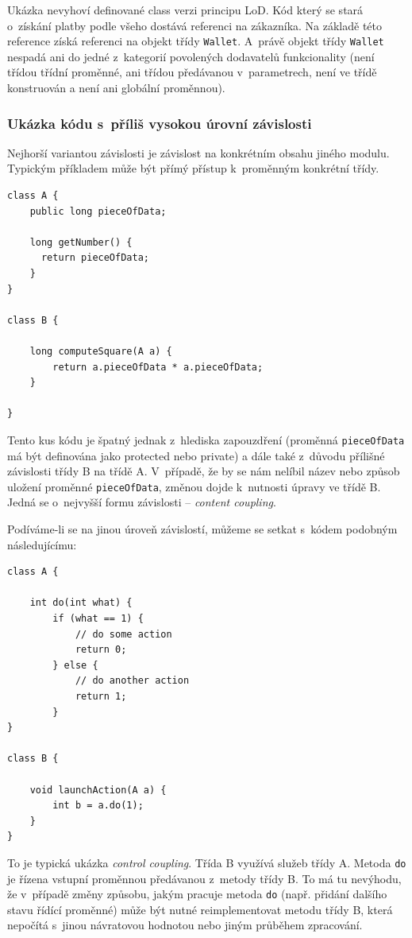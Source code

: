 Ukázka nevyhoví definované class verzi principu LoD. Kód který se stará o~získání platby podle všeho dostává referenci na zákazníka. Na základě této reference získá referenci na objekt třídy \verb+Wallet+. A~právě objekt třídy \verb+Wallet+ nespadá ani do jedné z~kategorií povolených dodavatelů funkcionality (není třídou třídní proměnné, ani třídou předávanou v~parametrech, není ve třídě konstruován a není ani globální proměnnou).

\subsubsection{Ukázka kódu s~příliš vysokou úrovní závislosti}
Nejhorší variantou závislosti je závislost na konkrétním obsahu jiného modulu. Typickým příkladem může být přímý přístup k~proměnným konkrétní třídy.

\begin{lstlisting}
class A {
    public long pieceOfData;

    long getNumber() {
      return pieceOfData;
    }
}

class B {

    long computeSquare(A a) {
        return a.pieceOfData * a.pieceOfData;
    }

}
\end{lstlisting}

Tento kus kódu je špatný jednak z~hlediska zapouzdření (proměnná \verb+pieceOfData+ má být definována jako protected nebo private) a dále také z~důvodu přílišné závislosti třídy B na třídě A. V~případě, že by se nám nelíbil název nebo způsob uložení proměnné \verb+pieceOfData+, změnou dojde k~nutnosti úpravy ve třídě B. Jedná se o~nejvyšší formu závislosti -- \emph{content coupling}.

Podíváme-li se na jinou úroveň závislostí, můžeme se setkat s~kódem podobným následujícímu:

\begin{lstlisting}
class A {

    int do(int what) {
        if (what == 1) {
            // do some action
            return 0;
        } else {
            // do another action
            return 1;
        }
}

class B {

    void launchAction(A a) {
        int b = a.do(1);
    }
}
\end{lstlisting}

To je typická ukázka \emph{control coupling}. Třída B využívá služeb třídy A. Metoda \verb+do+ je řízena vstupní proměnnou předávanou z~metody třídy B. To má tu nevýhodu, že v~případě změny způsobu, jakým pracuje metoda \verb+do+ (např. přidání dalšího stavu řídící proměnné) může být nutné reimplementovat metodu třídy B, která nepočítá s~jinou návratovou hodnotou nebo jiným průběhem zpracování.

